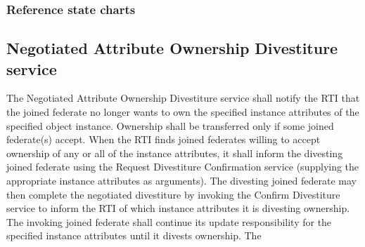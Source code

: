\begin{compactstdpage}

    \subsubsection{Reference state charts}



    \subsection{Negotiated Attribute Ownership Divestiture service}


    The Negotiated Attribute Ownership Divestiture service shall notify the RTI that the joined federate no longer wants to own the specified instance attributes of the specified object instance. Ownership shall be transferred only if some joined federate(s) accept. When the RTI finds joined federates willing to accept ownership of any or all of the instance attributes, it shall inform the divesting joined federate using the Request Divestiture Confirmation \rtiinitiated{} service (supplying the appropriate instance attributes as arguments). The divesting joined federate may then complete the negotiated divestiture by invoking the Confirm Divestiture service to inform the RTI of which instance attributes it is divesting ownership. The invoking joined federate shall continue its update responsibility for the specified instance attributes until it divests ownership. The

\end{compactstdpage}

\clearpage

